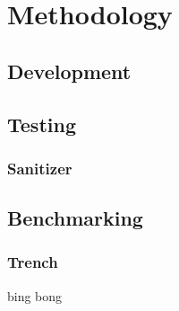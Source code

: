 \chapter{Methodology}
\lorem{}

\section{Development}
\lorem{}

\section{Testing}
\lorem{}

\subsection{Sanitizer}
\lorem{}

\section{Benchmarking}
\lorem{}

\subsection{Trench}
\lorem{}

bing bong
